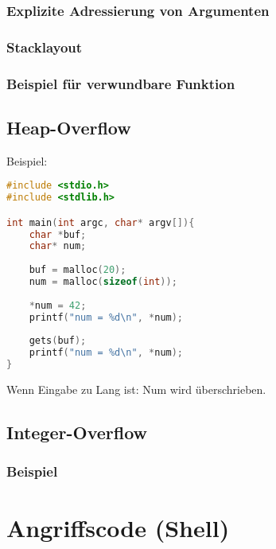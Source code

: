 \subsubsection{Explizite Adressierung von Argumenten}
\subsubsection*{Stacklayout}
\subsubsection{Beispiel für verwundbare Funktion}

\subsection{Heap-Overflow}
Beispiel: 
\begin{lstlisting}[language=C]
#include <stdio.h>
#include <stdlib.h>

int main(int argc, char* argv[]){
	char *buf;
	char* num;
	
	buf = malloc(20);
	num = malloc(sizeof(int));
	
	*num = 42;
	printf("num = %d\n", *num);
	
	gets(buf);
	printf("num = %d\n", *num);
}
\end{lstlisting}
Wenn Eingabe zu Lang ist: Num wird überschrieben.
\subsection{Integer-Overflow}
\subsubsection*{Beispiel}

\section{Angriffscode (Shell)}

